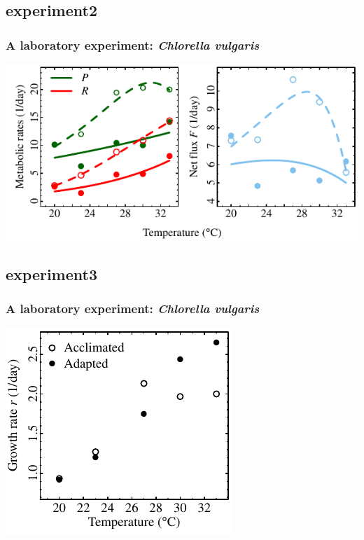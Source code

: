 \documentclass{beamer}
\begin{document}
\subsection{experiment2}
\begin{frame}
  \frametitle{A laboratory experiment: \textit{Chlorella vulgaris}}

  \begin{center}
    \includegraphics{figs/dan_res_pres.pdf}
  \end{center}

\end{frame}



\subsection{experiment3}
\begin{frame}
  \frametitle{A laboratory experiment: \textit{Chlorella vulgaris}}

  \begin{center}
    \includegraphics{figs/dan_res3_pres.pdf}
  \end{center}

\end{frame}
\end{document}
